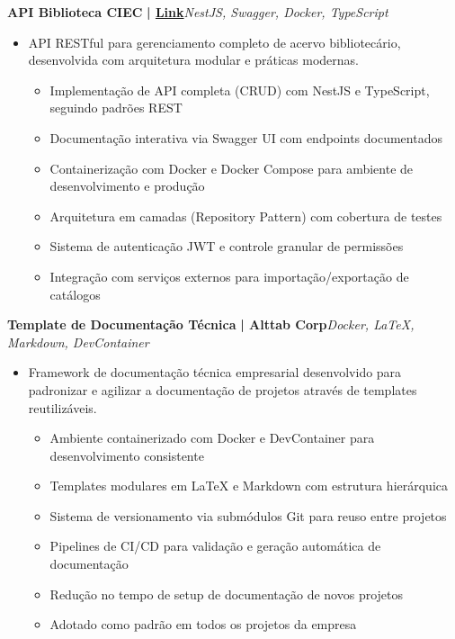 \documentclass[a4paper]{article}
\begin{document}
{\textbf{API Biblioteca CIEC}}\textbf{ | \href{https://github.com/Alttabcorp/API-bibliteca_siec}{Link}}\hfill{\sl NestJS, Swagger, Docker, TypeScript}\\
\vspace{-3mm}
\begin{itemize} \itemsep -3pt
    \item[] API RESTful para gerenciamento completo de acervo bibliotecário, desenvolvida com arquitetura modular e práticas modernas.
        \begin{itemize}
            \item Implementação de API completa (CRUD) com NestJS e TypeScript, seguindo padrões REST
            \item Documentação interativa via Swagger UI com endpoints documentados
            \item Containerização com Docker e Docker Compose para ambiente de desenvolvimento e produção
            \item Arquitetura em camadas (Repository Pattern) com cobertura de testes
            \item Sistema de autenticação JWT e controle granular de permissões
            \item Integração com serviços externos para importação/exportação de catálogos
        \end{itemize}
\end{itemize}
\vspace*{2mm}

{\textbf{Template de Documentação Técnica}}\textbf{ | Alttab Corp}\hfill{\sl Docker, LaTeX, Markdown, DevContainer}\\
\vspace{-3mm}
\begin{itemize} \itemsep -3pt
    \item[] Framework de documentação técnica empresarial desenvolvido para padronizar e agilizar a documentação de projetos através de templates reutilizáveis.
        \begin{itemize}
            \item Ambiente containerizado com Docker e DevContainer para desenvolvimento consistente
            \item Templates modulares em LaTeX e Markdown com estrutura hierárquica
            \item Sistema de versionamento via submódulos Git para reuso entre projetos
            \item Pipelines de CI/CD para validação e geração automática de documentação
            \item Redução no tempo de setup de documentação de novos projetos
            \item Adotado como padrão em todos os projetos da empresa
        \end{itemize}
\end{itemize}
\vspace*{2mm}
\end{document}
